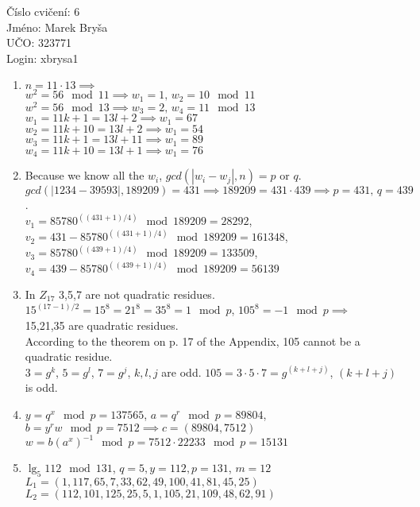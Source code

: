 \documentclass[a4paper,10pt]{extarticle}
\begin{document}
\begin{flushleft}
Číslo cvičení: 6 \\ 
Jméno: Marek Bryša \\
UČO: 323771\\
Login: xbrysa1\\
\end{flushleft}
\begin{enumerate}
  \item
    $n=11\cdot13 \implies$\\
    $w^2=56 \mod 11\implies w_1=1,\, w_2=10 \mod 11$\\
    $w^2=56 \mod 13\implies w_3=2,\, w_4=11 \mod 13$\\
    $w_1=11k+1=13l+2 \implies w_1=67$\\
    $w_2=11k+10=13l+2 \implies w_1=54$\\
    $w_3=11k+1=13l+11 \implies w_1=89$\\
    $w_4=11k+10=13l+1 \implies w_1=76$\\
  \item
    Because we know all the $w_i$, $gcd(|w_i-w_j|,n)=p$ or $q$.\\
    $gcd(|1234-39593|,189209)=431\implies189209=431\cdot439\implies p=431,\,q=439$.\\
    $v_1=85780^{((431+1)/4)} \mod 189209=28292$, $v_2=431-85780^{((431+1)/4)} \mod 189209=161348$,\\
    $v_3=85780^{((439+1)/4)} \mod 189209=133509$, $v_4=439-85780^{((439+1)/4)} \mod 189209=56139$
  \item
    In $Z_{17}$ 3,5,7 are not quadratic residues.
    $15^{(17-1)/2}=15^8 = 21^8 = 35^8 = 1 \mod p$, $105^8=-1 \mod p\implies$\\
    15,21,35 are quadratic residues.\\
    According to the theorem on p. 17 of the Appendix, 105 cannot be a quadratic residue.\\
    $3=g^k$, $5=g^l$, $7=g^j$, $k,l,j$ are odd.
    $105=3\cdot 5\cdot 7=g^{(k+l+j)}$, $(k+l+j)$ is odd.
  \item
    $y=q^x \mod p=137565$, $a=q^r \mod p=89804$, $b=y^r w \mod p = 7512\implies c=(89804,7512)$\\
    $w=b(a^x)^{-1} \mod p=7512\cdot 22233\mod p = 15131 $
  \item
    $\lg_5 112 \mod 131$, $q=5,y=112,p=131$, $m=12$\\
    $L_1=(1, 117, 65, 7, 33, 62, 49, 100, 41, 81, 45, 25)$\\
    $L_2=(112, 101, 125, 25, 5, 1, 105, 21, 109, 48, 62, 91)$\\

\end{enumerate}
\end{document}
